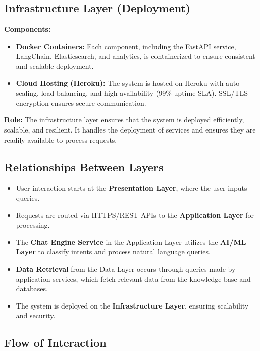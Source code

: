\subsection{Infrastructure Layer (Deployment)}

\textbf{Components:}
\begin{itemize}
    \item \textbf{Docker Containers:} Each component, including the FastAPI service, LangChain, Elasticsearch, and analytics, is containerized to ensure consistent and scalable deployment.
    \item \textbf{Cloud Hosting (Heroku):} The system is hosted on Heroku with auto-scaling, load balancing, and high availability (99\% uptime SLA). SSL/TLS encryption ensures secure communication.
\end{itemize}

\textbf{Role:} The infrastructure layer ensures that the system is deployed efficiently, scalable, and resilient. It handles the deployment of services and ensures they are readily available to process requests.

\subsection{Relationships Between Layers}

\begin{itemize}
    \item User interaction starts at the \textbf{Presentation Layer}, where the user inputs queries.
    \item Requests are routed via HTTPS/REST APIs to the \textbf{Application Layer} for processing.
    \item The \textbf{Chat Engine Service} in the Application Layer utilizes the \textbf{AI/ML Layer} to classify intents and process natural language queries.
    \item \textbf{Data Retrieval} from the Data Layer occurs through queries made by application services, which fetch relevant data from the knowledge base and databases.
    \item The system is deployed on the \textbf{Infrastructure Layer}, ensuring scalability and security.
\end{itemize}

\subsection{Flow of Interaction}

